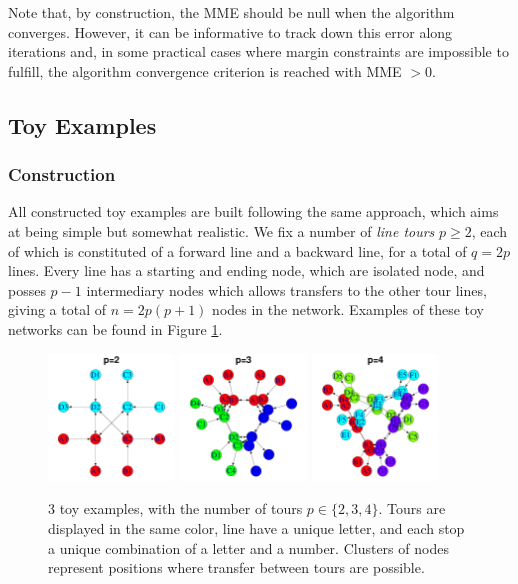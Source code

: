 \documentclass{bmcart}
\begin{document}
Note that, by construction, the MME should be null when the algorithm converges. However, it can be informative to track down this error along iterations and, in some practical cases where margin constraints are impossible to fulfill, the algorithm convergence criterion is reached with MME $> 0$.

\subsection{Toy Examples}
\label{toy_examples}

\subsubsection{Construction}
\label{example_construction}

All constructed toy examples are built following the same approach, which aims at being simple but somewhat realistic. We fix a number of \emph{line tours} $p \geq 2$, each of which is constituted of a forward line and a backward line, for a total of $q = 2p$ lines. Every line has a starting and ending node, which are isolated node, and posses $p-1$ intermediary nodes which allows transfers to the other tour lines, giving a total of $n = 2p(p + 1)$ nodes in the network. Examples of these toy networks can be found in Figure \ref{toy_example_plots}.

\begin{figure}[h]
	\includegraphics[width=0.3\textwidth]{fig/toy_2_display.pdf}
	\includegraphics[width=0.3\textwidth]{fig/toy_3_display.pdf}
	\includegraphics[width=0.3\textwidth]{fig/toy_4_display.pdf}
	\caption{3 toy examples, with the number of tours $p \in \{2,3,4\}$. Tours are displayed in the same color, line have a unique letter, and each stop a unique combination of a letter and a number. Clusters of nodes represent positions where transfer between tours are possible.}
	\label{toy_example_plots}
\end{figure}
\end{document}

